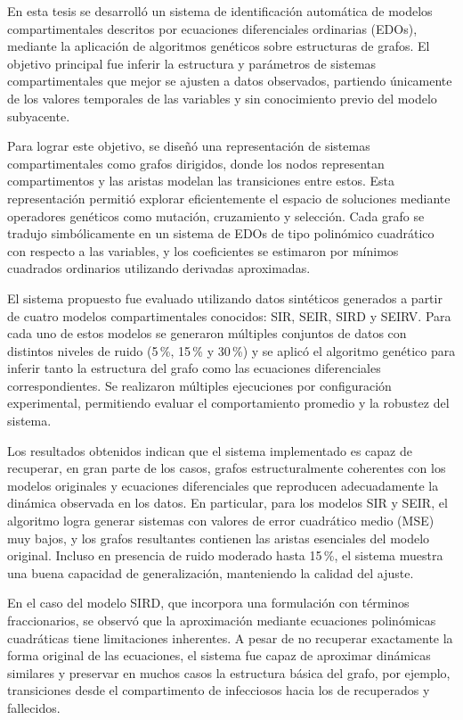\begin{conclusions}


En esta tesis se desarrolló un sistema de identificación automática de modelos compartimentales descritos por ecuaciones diferenciales ordinarias (EDOs), mediante la aplicación de algoritmos genéticos sobre estructuras de grafos. El objetivo principal fue inferir la estructura y parámetros de sistemas compartimentales que mejor se ajusten a datos observados, partiendo únicamente de los valores temporales de las variables y sin conocimiento previo del modelo subyacente.

Para lograr este objetivo, se diseñó una representación de sistemas compartimentales como grafos dirigidos, donde los nodos representan compartimentos y las aristas modelan las transiciones entre estos. Esta representación permitió explorar eficientemente el espacio de soluciones mediante operadores genéticos como mutación, cruzamiento y selección. Cada grafo se tradujo simbólicamente en un sistema de EDOs de tipo polinómico cuadrático con respecto a las variables, y los coeficientes se estimaron por mínimos cuadrados ordinarios utilizando derivadas aproximadas.

El sistema propuesto fue evaluado utilizando datos sintéticos generados a partir de cuatro modelos compartimentales conocidos: SIR, SEIR, SIRD y SEIRV. Para cada uno de estos modelos se generaron múltiples conjuntos de datos con distintos niveles de ruido (5\,\%, 15\,\% y 30\,\%) y se aplicó el algoritmo genético para inferir tanto la estructura del grafo como las ecuaciones diferenciales correspondientes. Se realizaron múltiples ejecuciones por configuración experimental, permitiendo evaluar el comportamiento promedio y la robustez del sistema.

Los resultados obtenidos indican que el sistema implementado es capaz de recuperar, en gran parte de los casos, grafos estructuralmente coherentes con los modelos originales y ecuaciones diferenciales que reproducen adecuadamente la dinámica observada en los datos. En particular, para los modelos SIR y SEIR, el algoritmo logra generar sistemas con valores de error cuadrático medio (MSE) muy bajos, y los grafos resultantes contienen las aristas esenciales del modelo original. Incluso en presencia de ruido moderado hasta 15\,\%, el sistema muestra una buena capacidad de generalización, manteniendo la calidad del ajuste.

En el caso del modelo SIRD, que incorpora una formulación con términos fraccionarios, se observó que la aproximación mediante ecuaciones polinómicas cuadráticas tiene limitaciones inherentes. A pesar de no recuperar exactamente la forma original de las ecuaciones, el sistema fue capaz de aproximar dinámicas similares y preservar en muchos casos la estructura básica del grafo, por ejemplo, transiciones desde el compartimento de infecciosos hacia los de recuperados y fallecidos.


\end{conclusions}
